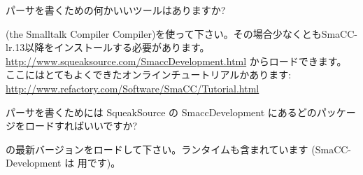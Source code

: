 \documentclass[a4paper,10pt,twoside]{book}
\begin{document}
\begin{faq}
パーサを書くための何かいいツールはありますか?
\end{faq}
\answer
{}(the Smalltalk Compiler Compiler)を使って下さい。その場合少なくともSmaCC-lr.13以降をインストールする必要があります。
\url{http://www.squeaksource.com/SmaccDevelopment.html} からロードできます。
ここにはとてもよくできたオンラインチュートリアルかあります:
\url{http://www.refactory.com/Software/SmaCC/Tutorial.html}

\begin{faq}
パーサを書くためには SqueakSource の SmaccDevelopment にあるどのパッケージをロードすればいいですか?
\end{faq}
\answer
{} の最新バージョンをロードして下さい。ランタイムも含まれています
(SmaCC-Development は  用です)。

\ifx\wholebook\relax\else
\end{document}
